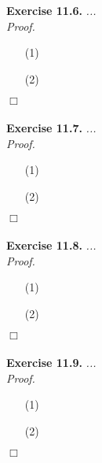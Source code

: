 \documentclass{article}
\begin{document}



\textbf{Exercise 11.6.}
\emph{...} \\

\emph{Proof.}
\begin{enumerate}
\item[(1)]
\item[(2)]

\end{enumerate}
$\Box$ \\\\






\textbf{Exercise 11.7.}
\emph{...} \\

\emph{Proof.}
\begin{enumerate}
\item[(1)]
\item[(2)]

\end{enumerate}
$\Box$ \\\\






\textbf{Exercise 11.8.}
\emph{...} \\

\emph{Proof.}
\begin{enumerate}
\item[(1)]
\item[(2)]

\end{enumerate}
$\Box$ \\\\






\textbf{Exercise 11.9.}
\emph{...} \\

\emph{Proof.}
\begin{enumerate}
\item[(1)]
\item[(2)]

\end{enumerate}
$\Box$ \\\\
\end{document}

